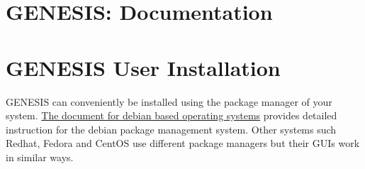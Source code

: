\documentclass[12pt]{article}
\begin{document}
\section*{GENESIS: Documentation}

\section*{GENESIS User Installation}

GENESIS can conveniently be installed using the package manager of
your system.
\href{../installation-debian/installation-debian.tex}{The document for
  debian based operating systems} provides detailed instruction for
the debian package management system.  Other systems such Redhat,
Fedora and CentOS use different package managers but their GUIs work
in similar ways.






\end{document}
